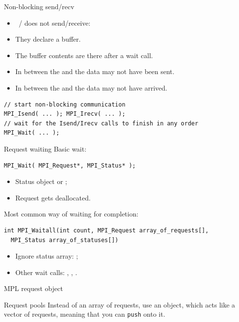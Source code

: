 \begin{numberedframe}{Non-blocking send/recv}
  \begin{itemize}
  \item {}~/  does not send/receive:
  \item They declare a buffer.
  \item The buffer contents are there after a wait call.
  \item In between the  and 
    the data may not have been sent.
  \item In between the  and 
    the data may not have arrived.
  \end{itemize}
\lstset{language=C}
\begin{lstlisting}
// start non-blocking communication
MPI_Isend( ... ); MPI_Irecv( ... );
// wait for the Isend/Irecv calls to finish in any order
MPI_Wait( ... );  
\end{lstlisting}
\end{numberedframe}


\begin{numberedframe}{Request waiting}
Basic wait:
\begin{lstlisting}
MPI_Wait( MPI_Request*, MPI_Status* );
\end{lstlisting}
\begin{itemize}
\item Status object or ;
\item Request gets deallocated.
\end{itemize}

Most common way of waiting for completion:
\begin{lstlisting}
int MPI_Waitall(int count, MPI_Request array_of_requests[], 
  MPI_Status array_of_statuses[])
\end{lstlisting}
\begin{itemize}
\item Ignore status array: ;
\item Other wait calls:
  , , .
\end{itemize}
\end{numberedframe}

\begin{mpl}
\begin{numberedframe}{MPL request object}
    
\end{numberedframe}
\begin{numberedframe}{Request pools}
  Instead of an array of requests,
  use an  object,
  which acts like a vector of requests,
  meaning that you can \lstinline+push+ onto it.


  
\end{numberedframe}
\end{mpl}

